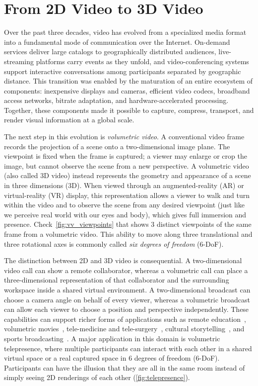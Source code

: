 \section{From 2D Video to 3D Video}
\label{sec:intro_v2_background}

Over the past three decades, video has evolved from a specialized media format into a fundamental mode of communication over the Internet. 
%
On-demand services deliver large catalogs to geographically distributed audiences, live-streaming platforms carry events as they unfold, and video-conferencing systems support interactive conversations among participants separated by geographic distance.
%
This transition was enabled by the maturation of an entire ecosystem of components: inexpensive displays and cameras, efficient video codecs, broadband access networks, bitrate adaptation, and hardware-accelerated processing. 
%
Together, these components made it possible to capture, compress, transport, and render visual information at a global scale.

The next step in this evolution is \textit{volumetric video}. 
%
A conventional video frame records the projection of a scene onto a two-dimensional image plane. 
%
The viewpoint is fixed when the frame is captured; a viewer may enlarge or crop the image, but cannot observe the scene from a new perspective. 
%
A volumetric video (also called 3D video) instead represents the geometry and appearance of a scene in three dimensions (3D). 
%
When viewed through an augmented-reality (AR) or virtual-reality (VR) display, this representation allows a viewer to walk and turn within the video and to observe the scene from any desired viewpoint (just like we perceive real world with our eyes and body), which gives full immersion and presence. 
%
Check~\cref{fig:vv_viewpoints} that shows 3 distinct viewpoints of the same frame from a volumetric video.
%
This ability to move along three translational and three rotational axes is commonly called \textit{six degrees of freedom} (6-DoF).

The distinction between 2D and 3D video is consequential. A two-dimensional video call can show a remote collaborator, whereas a volumetric call can place a three-dimensional representation of that collaborator and the surrounding workspace inside a shared virtual environment. 
%
A two-dimensional broadcast can choose a camera angle on behalf of every viewer, whereas a volumetric broadcast can allow each viewer to choose a position and perspective independently.
%
These capabilities can support richer forms of applications such as remote education~\cite{volumetric:education}, volumetric movies~\cite{volumetric:filmmaking}, tele-medicine and tele-surgery~\cite{volumetric:telemedicine}, cultural storytelling~\cite{volumetric-museology}, and sports broadcasting~\cite{volumetric-golf,volumetric-sports}.
%
A major application in this domain is volumetric telepresence, where multiple participants can interact with each other in a shared virtual space or a real captured space in 6 degrees of freedom (6-DoF).
%
Participants can have the illusion that they are all in the same room instead of simply seeing 2D renderings of each other (\cref{fig:telepresence}).

